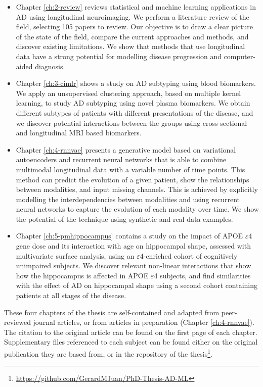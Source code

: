 \begin{itemize}
    \item Chapter \ref{ch:2-review} reviews statistical and machine learning applications in AD using longitudinal neuroimaging. We perform a literature review of the field, selecting 105 papers to review. Our objective is to draw a clear picture of the state of the field, compare the current approaches and methods, and discover existing limitations. We show that methods that use longitudinal data have a strong potential for modelling disease progression and computer-aided diagnosis. 
    \item Chapter \ref{ch:3-cimlr} shows a study on AD subtyping using blood biomarkers. We apply an unsupervised clustering approach, based on multiple kernel learning, to study AD subtyping using novel plasma biomarkers. We obtain different subtypes of patients with different presentations of the disease, and we discover potential interactions between the groups using cross-sectional and longitudinal MRI based biomarkers.
    \item Chapter \ref{ch:4-rnnvae} presents a generative model based on variational autoencoders and recurrent neural networks that is able to combine multimodal longitudinal data with a variable number of time points. This method can predict the evolution of a given patient, show the relationships between modalities, and input missing channels. This is achieved by explicitly modelling the interdependencies between modalities and using recurrent neural networks to capture the evolution of each modality over time. We show the potential of the technique using synthetic and real data examples.
    \item Chapter \ref{ch:5-pmhippocampus} contains a study on the impact of APOE $\varepsilon$4 gene dose and its interaction with age on hippocampal shape, assessed with multivariate surface analysis, using an $\varepsilon$4-enriched cohort of cognitively unimpaired subjects. We discover relevant non-linear interactions that show how the hippocampus is affected in APOE $\varepsilon$4 subjects, and find similarities with the effect of AD on hippocampal shape using a second cohort containing patients at all stages of the disease.
\end{itemize}

These four chapters of the thesis are self-contained and adapted from peer-reviewed journal articles, or from articles in preparation (Chapter \ref{ch:4-rnnvae}). The citation to the original article can be found on the first page of each chapter. Supplementary files referenced to each subject can be found either on the original publication they are based from, or in the repository of the thesis\footnote{\url{https://github.com/GerardMJuan/PhD-Thesis-AD-ML}}.